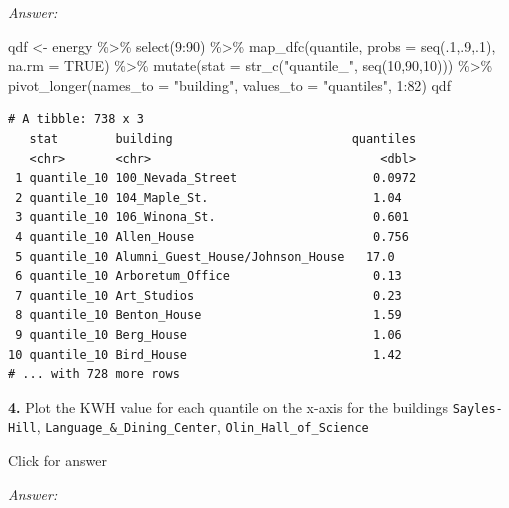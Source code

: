 \documentclass[
]{book}
\newenvironment{Shaded}{\begin{snugshade}}{\end{snugshade}}
\newcommand{\AttributeTok}[1]{\textcolor[rgb]{0.77,0.63,0.00}{#1}}
\newcommand{\ConstantTok}[1]{\textcolor[rgb]{0.00,0.00,0.00}{#1}}
\newcommand{\DecValTok}[1]{\textcolor[rgb]{0.00,0.00,0.81}{#1}}
\newcommand{\FunctionTok}[1]{\textcolor[rgb]{0.00,0.00,0.00}{#1}}
\newcommand{\NormalTok}[1]{#1}
\newcommand{\OtherTok}[1]{\textcolor[rgb]{0.56,0.35,0.01}{#1}}
\newcommand{\SpecialCharTok}[1]{\textcolor[rgb]{0.00,0.00,0.00}{#1}}
\newcommand{\StringTok}[1]{\textcolor[rgb]{0.31,0.60,0.02}{#1}}
\begin{document}
\emph{Answer:}

\begin{Shaded}
\begin{Highlighting}[]
\NormalTok{qdf }\OtherTok{\textless{}{-}}\NormalTok{ energy }\SpecialCharTok{\%\textgreater{}\%} \FunctionTok{select}\NormalTok{(}\DecValTok{9}\SpecialCharTok{:}\DecValTok{90}\NormalTok{) }\SpecialCharTok{\%\textgreater{}\%}
  \FunctionTok{map\_dfc}\NormalTok{(quantile, }\AttributeTok{probs =} \FunctionTok{seq}\NormalTok{(.}\DecValTok{1}\NormalTok{,.}\DecValTok{9}\NormalTok{,.}\DecValTok{1}\NormalTok{), }\AttributeTok{na.rm =} \ConstantTok{TRUE}\NormalTok{) }\SpecialCharTok{\%\textgreater{}\%}  
  \FunctionTok{mutate}\NormalTok{(}\AttributeTok{stat =} \FunctionTok{str\_c}\NormalTok{(}\StringTok{"quantile\_"}\NormalTok{, }\FunctionTok{seq}\NormalTok{(}\DecValTok{10}\NormalTok{,}\DecValTok{90}\NormalTok{,}\DecValTok{10}\NormalTok{))) }\SpecialCharTok{\%\textgreater{}\%}   
  \FunctionTok{pivot\_longer}\NormalTok{(}\AttributeTok{names\_to =} \StringTok{"building"}\NormalTok{, }\AttributeTok{values\_to =} \StringTok{"quantiles"}\NormalTok{, }\DecValTok{1}\SpecialCharTok{:}\DecValTok{82}\NormalTok{)}
\NormalTok{qdf}
\end{Highlighting}
\end{Shaded}

\begin{verbatim}
# A tibble: 738 x 3
   stat        building                         quantiles
   <chr>       <chr>                                <dbl>
 1 quantile_10 100_Nevada_Street                   0.0972
 2 quantile_10 104_Maple_St.                       1.04  
 3 quantile_10 106_Winona_St.                      0.601 
 4 quantile_10 Allen_House                         0.756 
 5 quantile_10 Alumni_Guest_House/Johnson_House   17.0   
 6 quantile_10 Arboretum_Office                    0.13  
 7 quantile_10 Art_Studios                         0.23  
 8 quantile_10 Benton_House                        1.59  
 9 quantile_10 Berg_House                          1.06  
10 quantile_10 Bird_House                          1.42  
# ... with 728 more rows
\end{verbatim}

\textbf{4.} Plot the KWH value for each quantile on the x-axis for the buildings \texttt{Sayles-Hill}, \texttt{Language\_\&\_Dining\_Center}, \texttt{Olin\_Hall\_of\_Science}

Click for answer

\emph{Answer:}
\end{document}
